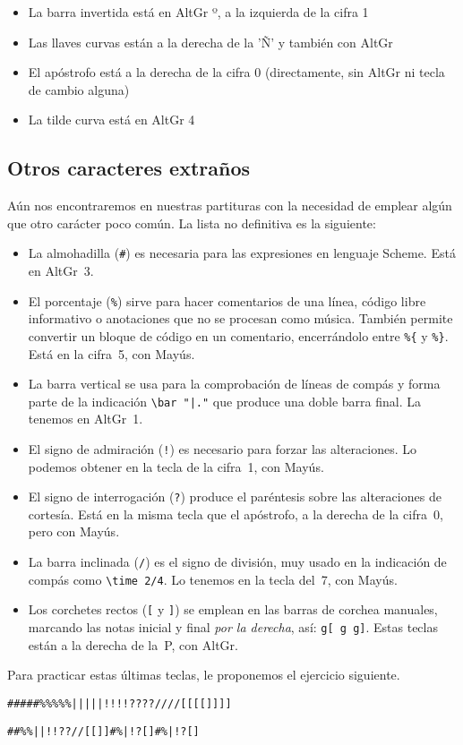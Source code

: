 \begin{itemize}
\item La barra invertida está en AltGr º, a la izquierda de la cifra 1
\item Las llaves curvas están a la derecha de la 'Ñ' y también con AltGr
\item El apóstrofo está a la derecha de la cifra 0 (directamente, sin AltGr ni tecla de cambio alguna)
\item La tilde curva está en AltGr 4
\end{itemize}

\subsection{Otros caracteres extraños}

Aún nos encontraremos en nuestras partituras con la necesidad de
emplear algún que otro carácter poco común. La lista no definitiva es
la siguiente:

\begin{itemize}
\item La almohadilla (\verb+#+) es necesaria para las expresiones en
  lenguaje Scheme. Está en AltGr~3.
\item El porcentaje (\verb+%+) sirve para hacer comentarios de una
  línea, código libre informativo o anotaciones que no se procesan
  como música. También permite convertir un bloque de código en un
  comentario, encerrándolo entre \verb+%{+ y \verb+%}+. Está en la
  cifra~5, con Mayús.
\item La barra vertical se usa para la comprobación de líneas de
  compás y forma parte de la indicación \verb+\bar "|."+ que produce
  una doble barra final. La tenemos en AltGr~1.
\item El signo de admiración (\verb+!+) es necesario para forzar las
  alteraciones. Lo podemos obtener en la tecla de la cifra~1, con
  Mayús.
\item El signo de interrogación (\verb+?+) produce el paréntesis sobre
  las alteraciones de cortesía. Está en la misma tecla que el
  apóstrofo, a la derecha de la cifra~0, pero con Mayús.
\item La barra inclinada (\verb+/+) es el signo de división, muy usado
  en la indicación de compás como \verb+\time 2/4+. Lo tenemos en la
  tecla del~7, con Mayús.
\item Los corchetes rectos (\verb+[+ y \verb+]+) se emplean en las
  barras de corchea manuales, marcando las notas inicial y final
  \emph{por la derecha}, así: \verb+g[ g g]+. Estas teclas están a la
  derecha de la~P, con AltGr.
\end{itemize}

Para practicar estas últimas teclas, le proponemos el ejercicio siguiente.

\verb+#####%%%%%|||||!!!!????////[[[[]]]]+

\verb+##%%||!!??//[[]]#%|!?[]#%|!?[]+
